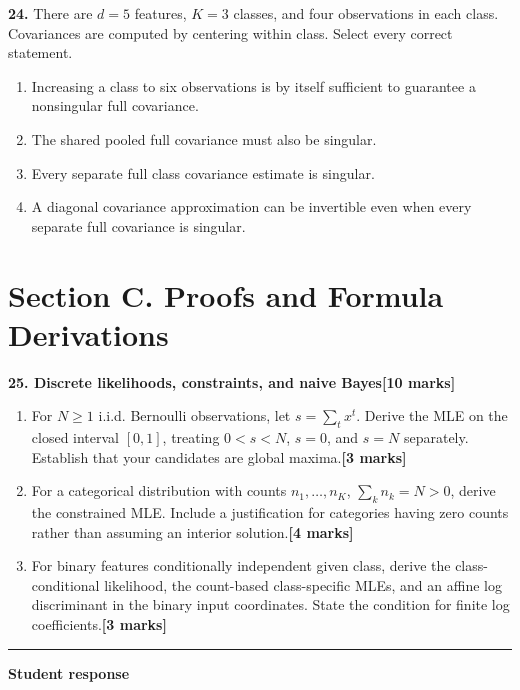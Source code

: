 \documentclass[11pt,a4paper]{article}
\begin{document}
\par\noindent\begin{minipage}{\linewidth}
\textbf{24.} There are \(d=5\) features, \(K=3\) classes, and four observations in each class. Covariances are computed by centering within class. Select every correct statement.
\begin{enumerate}[label=(\Alph*),leftmargin=8mm,itemsep=2pt,topsep=2pt]
\item Increasing a class to six observations is by itself sufficient to guarantee a nonsingular full covariance.
\item The shared pooled full covariance must also be singular.
\item Every separate full class covariance estimate is singular.
\item A diagonal covariance approximation can be invertible even when every separate full covariance is singular.
\end{enumerate}

\end{minipage}\par\vspace{3mm}
\newpage\section*{Section C. Proofs and Formula Derivations}
\textbf{25. Discrete likelihoods, constraints, and naive Bayes}\hfill\textbf{[10 marks]}\par\medskip
\begin{enumerate}[label=(\alph*),leftmargin=8mm,itemsep=3pt]
\item For \(N\ge1\) i.i.d. Bernoulli observations, let \(s=\sum_t x^t\). Derive the MLE on the closed interval \([0,1]\), treating \(0<s<N\), \(s=0\), and \(s=N\) separately. Establish that your candidates are global maxima.\hfill\textbf{[3 marks]}
\item For a categorical distribution with counts \(n_1,\ldots,n_K\), \(\sum_kn_k=N>0\), derive the constrained MLE. Include a justification for categories having zero counts rather than assuming an interior solution.\hfill\textbf{[4 marks]}
\item For binary features conditionally independent given class, derive the class-conditional likelihood, the count-based class-specific MLEs, and an affine log discriminant in the binary input coordinates. State the condition for finite log coefficients.\hfill\textbf{[3 marks]}
\end{enumerate}\par\medskip\hrule\medskip\textbf{Student response}\par
\end{document}

